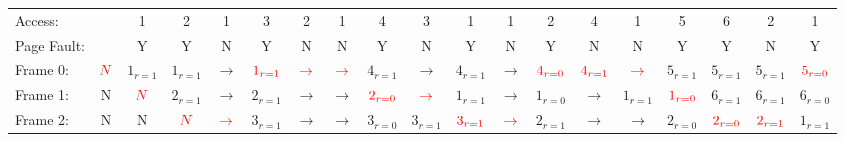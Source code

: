 \documentclass{report}
\newcommand{\ptr}[1]{\text{\textcolor{red}{$#1$}}}
\begin{document}
\begin{tiny}
	\begin{center}
		\begin{tabular}{l c c c c c c c c c c c c c c c c c c}
			Access:     &           & 1         & 2         & 1           & 3               & 2           & 1           & 4               & 3           & 1               & 1           & 2               & 4           & 1           & 5               & 6               & 2               & 1               \\
			Page Fault: &           & Y         & Y         & N           & Y               & N           & N           & Y               & N           & Y               & N           & Y               & N           & N           & Y               & Y               & N               & Y               \\
			Frame 0:    & $\ptr{N}$ & $1_{r=1}$ & $1_{r=1}$ & $\to$       & $\ptr{1_{r=1}}$ & $\ptr{\to}$ & $\ptr{\to}$ & $4_{r=1}$       & $\to$       & $4_{r=1}$       & $\to$       & $\ptr{4_{r=0}}$ & $\ptr{4_{r=1}}$ & $\ptr{\to}$ & $5_{r=1}$       & $5_{r=1}$       & $5_{r=1}$       & $\ptr{5_{r=0}}$ \\
			Frame 1:    & N         & $\ptr{N}$ & $2_{r=1}$ & $\to$       & $2_{r=1}$       & $\to$       & $\to$       & $\ptr{2_{r=0}}$ & $\ptr{\to}$ & $1_{r=1}$       & $\to$       & $1_{r=0}$       & $\to$       & $1_{r=1}$       & $\ptr{1_{r=0}}$ & $6_{r=1}$       & $6_{r=1}$       & $6_{r=0}$       \\
			Frame 2:    & N         & N         & $\ptr{N}$ & $\ptr{\to}$ & $3_{r=1}$       & $\to$       & $\to$       & $3_{r=0}$       & $3_{r=1}$   & $\ptr{3_{r=1}}$ & $\ptr{\to}$ & $2_{r=1}$       & $\to$       & $\to$       & $2_{r=0}$       & $\ptr{2_{r=0}}$ & $\ptr{2_{r=1}}$ & $1_{r=1}$       \\
		\end{tabular}
	\end{center}
\end{tiny}
\end{document}
